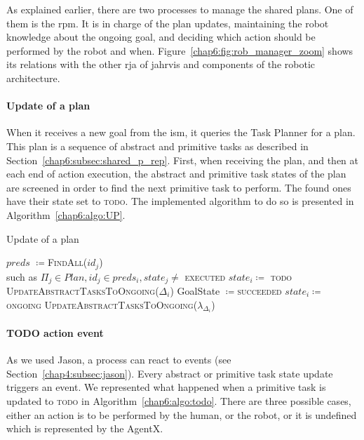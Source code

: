 \documentclass[a4paper,11pt,twoside]{StyleThese}
\begin{document}
As explained earlier, there are two processes to manage the shared plans. One of them is the \acrfull{rpm}. It is in charge of the plan updates, maintaining the robot knowledge about the ongoing goal, and deciding which action should be performed by the robot and when. Figure~\ref{chap6:fig:rob_manager_zoom} shows its relations with the other \acrshort{rja} of \acrshort{jahrvis} and components of the robotic architecture.

\paragraph{Update of a plan}
When it receives a new goal from the \acrlong{ism}, it queries the Task Planner for a plan. This plan is a sequence of abstract and primitive tasks as described in Section~\ref{chap6:subsec:shared_p_rep}. First, when receiving the plan, and then at each end of action execution, the abstract and primitive task states of the plan are screened in order to find the next primitive task to perform. The found ones have their state set to \textsc{todo}. The implemented algorithm to do so is presented in Algorithm~\ref{chap6:algo:UP}. 

\begin{algorithm}[!htb]
	\caption{Update of a plan}
	\label{chap6:algo:UP}
	\begin{algorithmic}
		\State $preds$ $\coloneqq$\textsc{FindAll}($id_j$) 
		\\\hfill such as $\Pi_j \in Plan, id_j \in preds_i,state_j\neq$ \textsc{executed} 
		\State $state_i\coloneqq$ \textsc{todo} 
		\State \textsc{UpdateAbstractTasksToOngoing($\Delta_i$)}
		\EndIf
		\EndFor
		\State GoalState $\coloneqq$\textsc{succeeded}
		\EndIf
		\EndFunction
		\Statex
		\State $state_i \coloneqq$ \textsc{ongoing} 
		\State \textsc{UpdateAbstractTasksToOngoing($\lambda_{\Delta_i}$)}
		\EndIf
		\EndFunction
	\end{algorithmic}
\end{algorithm}

\paragraph{TODO action event}
As we used Jason, a process can react to events (see Section~\ref{chap4:subsec:jason}). Every abstract or primitive task state update triggers an event. We represented what happened when a primitive task is updated to \textsc{todo} in Algorithm~\ref{chap6:algo:todo}. There are three possible cases, either an action is to be performed by the human, or the robot, or it is undefined which is represented by the AgentX. 
\end{document}
